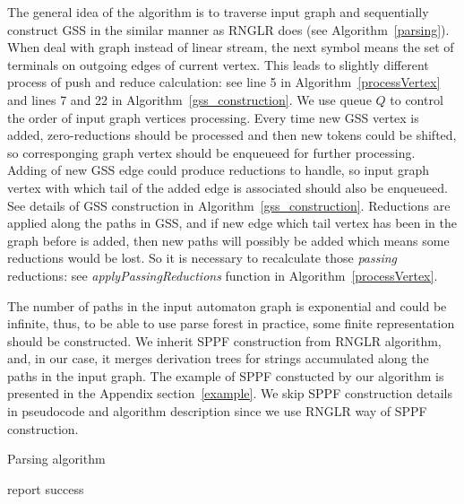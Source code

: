 The general idea of the algorithm is to traverse input graph and sequentially construct GSS
in the similar manner as RNGLR does (see Algorithm~\ref{parsing}). When deal with graph instead of linear stream,
the next symbol means the set of terminals on outgoing edges of current vertex.
This leads to slightly different process of push and reduce calculation: 
see line 5 in Algorithm~\ref{processVertex} and lines 7 and 22 in Algorithm~\ref{gss_construction}. 
We use queue $Q$ to control the order of input graph vertices processing. 
Every time new GSS vertex is added, zero-reductions should be processed 
and then new tokens could be shifted, so corresponging graph vertex should be 
enqueueed for further processing. Adding of new GSS edge could produce reductions 
to handle, so input graph vertex with which tail of the added edge is associated should 
also be enqueueed. See details of GSS construction in Algorithm~\ref{gss_construction}. 
Reductions are applied along the paths in GSS, and if new edge 
which tail vertex has been in the graph before is added, then new paths will possibly 
be added which means some reductions would be lost. So it is necessary to recalculate 
those \emph{passing} reductions: see \emph{applyPassingReductions} function in Algorithm~\ref{processVertex}.

The number of paths in the input automaton graph is exponential and could be infinite,
thus, to be able to use parse forest in practice, some finite representation should 
be constructed. We inherit SPPF construction from 
RNGLR algorithm, and, in our case, it merges derivation trees for strings accumulated 
along the paths in the input graph. The example of SPPF constucted by our algorithm is
presented in the Appendix section~\ref{example}. We skip SPPF construction details in 
pseudocode and algorithm description since we use RNGLR way of SPPF construction.
\begin{algorithm}[!ht]
\begin{algorithmic}[1]
\caption{Parsing algorithm}
\label{parsing}
     {report success}
    \EndIf
  \Else
    \EndWhile
    \EndIf
  \EndIf
\EndFunction
\end{algorithmic}
\end{algorithm}

